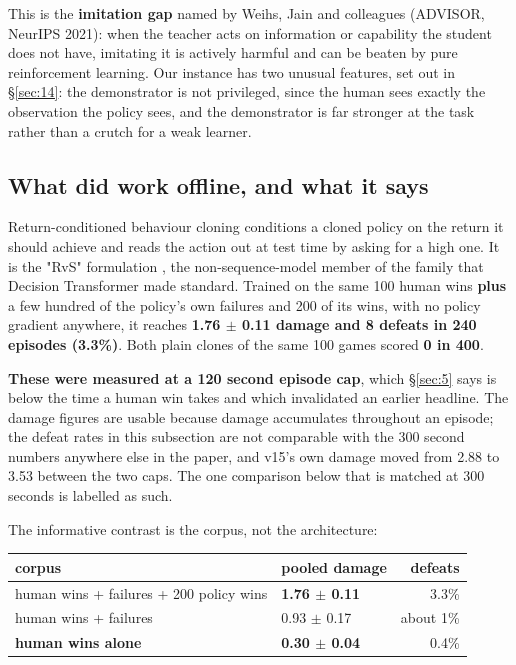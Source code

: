 \documentclass[11pt]{article}
\begin{document}
This is the \textbf{imitation gap} named by Weihs, Jain and colleagues (ADVISOR, NeurIPS 2021): when the teacher acts on information or capability the student does not have, imitating it is actively harmful and can be beaten by pure reinforcement learning. Our instance has two unusual features, set out in \S\ref{sec:14}: the demonstrator is not privileged, since the human sees exactly the observation the policy sees, and the demonstrator is far stronger at the task rather than a crutch for a weak learner.

\subsection{What did work offline, and what it says}
\label{sec:6.4}

Return-conditioned behaviour cloning conditions a cloned policy on the return it should achieve and reads the action out at test time by asking for a high one. It is the "RvS" formulation \cite{emmons2022rvs}, the non-sequence-model member of the family that Decision Transformer \cite{chen2021dt} made standard. Trained on the same 100 human wins \textbf{plus} a few hundred of the policy's own failures and 200 of its wins, with no policy gradient anywhere, it reaches \textbf{1.76 $\pm$ 0.11 damage and 8 defeats in 240 episodes (3.3\%)}. Both plain clones of the same 100 games scored \textbf{0 in 400}.

\textbf{These were measured at a 120 second episode cap}, which \S\ref{sec:5} says is below the time a human win takes and which invalidated an earlier headline. The damage figures are usable because damage accumulates throughout an episode; the defeat rates in this subsection are not comparable with the 300 second numbers anywhere else in the paper, and v15's own damage moved from 2.88 to 3.53 between the two caps. The one comparison below that is matched at 300 seconds is labelled as such.

The informative contrast is the corpus, not the architecture:

\begin{table}[!htbp]
  \centering
  \label{tab:offlinereturnconditionedclon}
\begin{center}\small
\begin{tabularx}{\linewidth}{@{}XXr@{}}
\toprule
\textbf{corpus} & \textbf{pooled damage} & \textbf{defeats} \\
\midrule
human wins + failures + 200 policy wins & \textbf{1.76 $\pm$ 0.11} & 3.3\% \\
human wins + failures & 0.93 $\pm$ 0.17 & about 1\% \\
\textbf{human wins alone} & \textbf{0.30 $\pm$ 0.04} & 0.4\% \\
\bottomrule
\end{tabularx}
\end{center}
\end{table}
\end{document}
